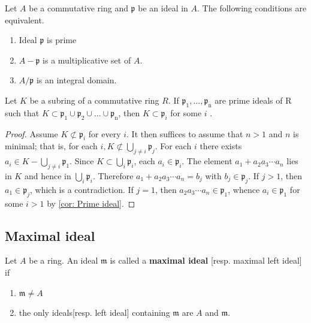 \begin{corollary}
    \label{cor: Prime ideal}
    Let $A$ be a commutative ring and $\mathfrak{p}$ be an ideal in $A$. The following conditions are equivalent.
    \begin{enumerate}
        \item
              Ideal $\mathfrak{p}$ is prime
        \item
              $A-\mathfrak{p}$ is a multiplicative set of $A$.
        \item
              ${A} / \mathfrak{p} $ is an integral domain.
    \end{enumerate}
\end{corollary}


\begin{proposition}
    \label{thm: lemma of primary decomposition}
    Let $K$ be a subring of a commutative ring $R$.
    If $\mathfrak{p}_1, \ldots, \mathfrak{p}_{\mathrm{n}}$ are prime ideals of R such that $K\subset \mathfrak{p}_1 \cup \mathfrak{p}_2 \cup \ldots \cup \mathfrak{p}_{\mathrm{n}}$, then $K \subset \mathfrak{p}_{i}$ for some $i$ .
    \begin{proof}
        Assume $K \not \subset \mathfrak{p}_i$ for every $i$. It then suffices to assume that $n>1$ and $n$ is minimal; that is, for each $i, K \not \subset \bigcup_{j \neq i} \mathfrak{p}_j$.
        For each $i$ there exists $a_i \in K-\bigcup_{j \neq i} \mathfrak{p}_1$. Since $K \subset \bigcup_i \mathfrak{p}_i$, each $a_i \in \mathfrak{p}_i$. The element $a_1+a_2 a_3 \cdots a_n$ lies in $K$
        and hence in $\bigcup_i \mathfrak{p}_i$. Therefore $a_1+a_2 a_3 \cdots a_n=b_j$ with $b_j \in \mathfrak{p}_j$. If $j>1$, then $a_1 \in \mathfrak{p}_j$, which is a contradiction. If $j=1$, then $a_2 a_3 \cdots a_n \in \mathfrak{p}_1$, whence $a_i \in \mathfrak{p}_1$ for some $i>1$ by \ref{cor: Prime ideal}.
    \end{proof}
\end{proposition}






\subsection{Maximal ideal} %

\begin{definition}
    Let $A$ be a ring. An ideal $\mathfrak{m}$ is called a \textbf{maximal ideal} [resp. maximal left ideal]
    if
    \begin{enumerate}[label=(\roman*)]
        \item
              $\mathfrak{m} \neq A$
        \item
              the only ideals[resp. left ideal] containing $\mathfrak{m}$ are $A$ and $\mathfrak{m}$.
    \end{enumerate}
\end{definition}


